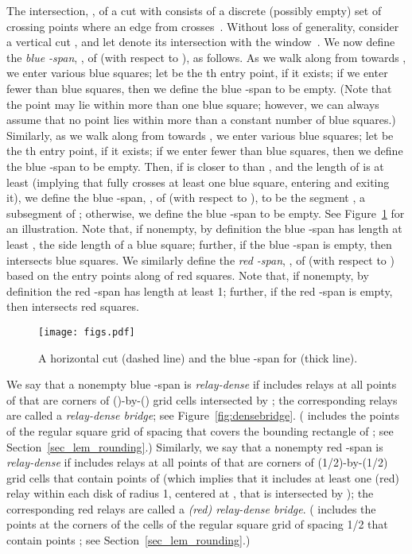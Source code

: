 \documentclass[11pt,a4paper]{article}
\theoremstyle{definition}
\theoremstyle{remark}
\begin{document}
\begin{enumerate}
The intersection, , of a cut  with
 consists of a discrete (possibly empty) set of
crossing points where an edge from  crosses~.
Without loss of generality, consider a vertical cut ,
and let  denote its intersection with the window~.
We now define the {\em blue -span},
, of  (with respect to ), as follows.
As we walk along  from  towards , we enter various blue squares;
let  be the th entry point, if it exists; if we enter fewer than 
blue squares, then we define the blue -span to be empty.
(Note that the point  may lie within more than one blue square;
however, we can always assume that no point lies within more than a constant number of blue squares.)
Similarly, as we walk along  from  towards , we enter various blue squares;
let  be the th entry point, if it exists; if we enter fewer than 
blue squares, then we define the blue -span to be empty.
Then, if  is closer to  than , and the length of  is at least  (implying that
 fully crosses at least one blue square, entering and exiting it), we define the blue -span,
, of  (with respect to ), to be the segment , a subsegment of ; otherwise,
we define the blue -span to be empty. See Figure~\ref{fig:bluespan} for an illustration.
Note that, if nonempty, by definition the blue -span has length at least , the side length of a blue square;
further, if the blue -span is empty, then  intersects  blue squares.
We similarly
define the {\em red -span}, , of  (with
respect to ) based on the entry points along  of red squares.
Note that, if nonempty, by definition the red -span has length at least 1;
further, if the red -span is empty, then  intersects  red squares.

\begin{figure}\centering
\texttt{[image: figs.pdf]}
\caption{A horizontal cut  (dashed line) and the blue -span  for  (thick line).}\label{fig:bluespan}
\end{figure}

We say that a nonempty blue
-span  is {\em relay-dense}
if  includes relays at
all points of  that are corners of ()-by-() grid cells intersected
by  ; the corresponding relays are called a {\em relay-dense bridge}; see Figure~\ref{fig:densebridge}.  ( includes the points  of the regular square grid of spacing
 that covers the bounding rectangle of ; see
Section~\ref{sec_lem_rounding}.)
Similarly, we say that a nonempty red -span is {\em relay-dense} if
 includes relays
at all points of  that are corners of (1/2)-by-(1/2) grid cells that contain points of 
(which implies that it includes at least one (red) relay within each disk of radius 1,
centered at , that is intersected by );
the corresponding red relays are called a {\em (red) relay-dense bridge}.
( includes the points  at the corners of the cells of the regular square grid of spacing 1/2 that contain points ;
see Section~\ref{sec_lem_rounding}.)


\end{enumerate}
\end{document}
